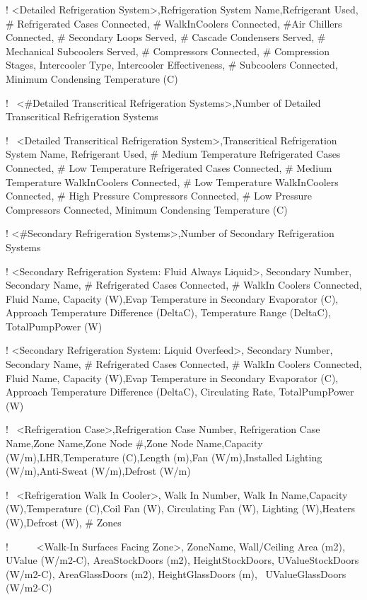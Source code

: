 ! \textless{}Detailed Refrigeration System\textgreater{},Refrigeration System Name,Refrigerant Used, \# Refrigerated Cases Connected, \# WalkInCoolers Connected, \#Air Chillers Connected, \# Secondary Loops Served, \# Cascade Condensers Served, \# Mechanical Subcoolers Served, \# Compressors Connected, \# Compression Stages, Intercooler Type, Intercooler Effectiveness, \# Subcoolers Connected, Minimum Condensing Temperature (C)

!~ \textless{}\#Detailed Transcritical Refrigeration Systems\textgreater{},Number of Detailed Transcritical Refrigeration Systems

!~ \textless{}Detailed Transcritical Refrigeration System\textgreater{},Transcritical Refrigeration System Name, Refrigerant Used, \# Medium Temperature Refrigerated Cases Connected, \# Low Temperature Refrigerated Cases Connected, \# Medium Temperature WalkInCoolers Connected, \# Low Temperature WalkInCoolers Connected, \# High Pressure Compressors Connected, \# Low Pressure Compressors Connected, Minimum Condensing Temperature (C)

! \textless{}\#Secondary Refrigeration Systems\textgreater{},Number of Secondary Refrigeration Systems

! \textless{}Secondary Refrigeration System: Fluid Always Liquid\textgreater{}, Secondary Number, Secondary Name, \# Refrigerated Cases Connected, \# WalkIn Coolers Connected, Fluid Name, Capacity (W),Evap Temperature in Secondary Evaporator (C), Approach Temperature Difference (DeltaC), Temperature Range (DeltaC), TotalPumpPower (W)

! \textless{}Secondary Refrigeration System: Liquid Overfeed\textgreater{}, Secondary Number, Secondary Name, \# Refrigerated Cases Connected, \# WalkIn Coolers Connected, Fluid Name, Capacity (W),Evap Temperature in Secondary Evaporator (C), Approach Temperature Difference (DeltaC), Circulating Rate, TotalPumpPower (W)

!~ \textless{}Refrigeration Case\textgreater{},Refrigeration Case Number, Refrigeration Case Name,Zone Name,Zone Node \#,Zone Node Name,Capacity (W/m),LHR,Temperature (C),Length (m),Fan (W/m),Installed Lighting (W/m),Anti-Sweat (W/m),Defrost (W/m)

!~ \textless{}Refrigeration Walk In Cooler\textgreater{}, Walk In Number, Walk In Name,Capacity (W),Temperature (C),Coil Fan (W), Circulating Fan (W), Lighting (W),Heaters (W),Defrost (W), \# Zones

!~~~~~ \textless{}Walk-In Surfaces Facing Zone\textgreater{}, ZoneName, Wall/Ceiling Area (m2), UValue (W/m2-C), AreaStockDoors (m2), HeightStockDoors, UValueStockDoors (W/m2-C), AreaGlassDoors (m2), HeightGlassDoors (m),~ UValueGlassDoors (W/m2-C)

